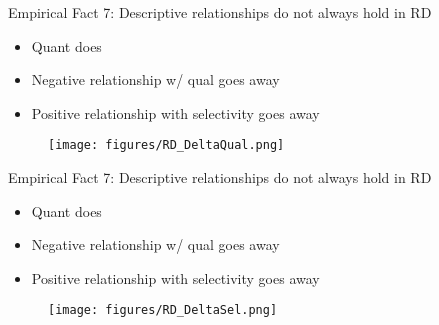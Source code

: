 \documentclass[table,10pt]{beamer}
\begin{document}
\begin{frame}{Empirical Fact 7: Descriptive relationships do not always hold in RD}

\begin{itemize}
\item Quant does
\item Negative relationship w/ qual goes away
\item Positive relationship with selectivity goes away
\end{itemize}
\begin{center}
\begin{minipage}[f]{\textwidth}
\begin{figure}[H]
 \centering
\texttt{[image: figures/RD\_DeltaQual.png]}
\end{figure}
\end{minipage}
\end{center}
\end{frame}



\begin{frame}{Empirical Fact 7: Descriptive relationships do not always hold in RD}

\begin{itemize}
\item Quant does
\item Negative relationship w/ qual goes away
\item Positive relationship with selectivity goes away
\end{itemize}
\begin{center}
\begin{minipage}[f]{\textwidth}
\begin{figure}[H]
 \centering
\texttt{[image: figures/RD\_DeltaSel.png]}
\end{figure}
\end{minipage}
\end{center}
\end{frame}
\end{document}
